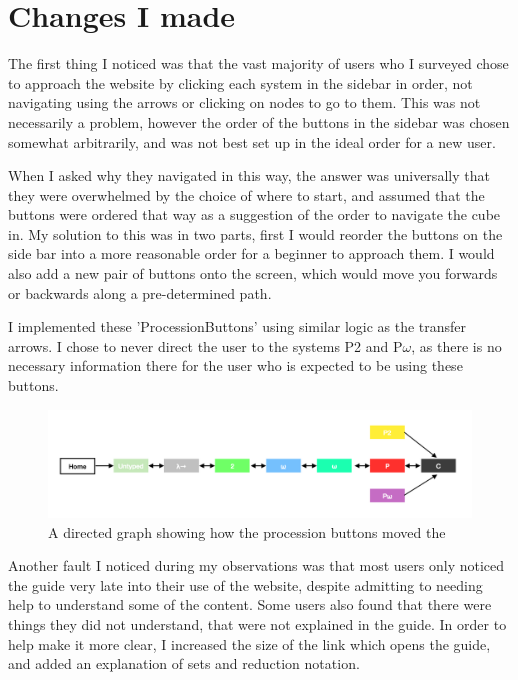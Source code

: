 \documentclass{l4proj}
\begin{document}
\section{Changes I made}

The first thing I noticed was that the vast majority of users who I surveyed chose to approach the website by clicking each system in the sidebar in order, not navigating using the arrows or clicking on nodes to go to them.  This was not necessarily a problem, however the order of the buttons in the sidebar was chosen somewhat arbitrarily, and was not best set up in the ideal order for a new user.

When I asked why they navigated in this way, the answer was universally that they were overwhelmed by the choice of where to start, and assumed that the buttons were ordered that way as a suggestion of the order to navigate the cube in.  My solution to this was in two parts, first I would reorder the buttons on the side bar into a more reasonable order for a beginner to approach them.  I would also add a new pair of buttons onto the screen, which would move you forwards or backwards along a pre-determined path.

I implemented these 'ProcessionButtons' using similar logic as the transfer arrows.  I chose to never direct the user to the systems P2 and P\underline{$\omega$}, as there is no necessary information there for the user who is expected to be using these buttons.

\begin{figure}[h!]
    \centering
    \includegraphics[width=1\linewidth]{dissertation/images/arrows_graph.png}
    \caption{A directed graph showing how the procession buttons moved the}
    \label{fig:enter-label}
\end{figure}    

Another fault I noticed during my observations was that most users only noticed the guide very late into their use of the website, despite admitting to needing help to understand some of the content.  Some users also found that there were things they did not understand, that were not explained in the guide.  In order to help make it more clear, I increased the size of the link which opens the guide, and added an explanation of sets and reduction notation.
\end{document}

